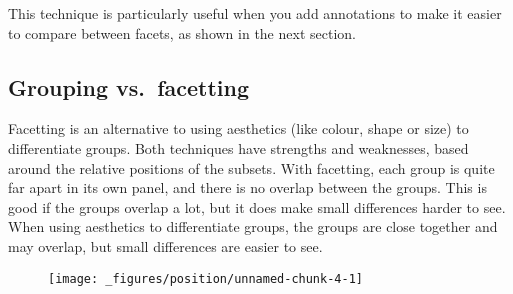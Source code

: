 This technique is particularly useful when you add annotations to make
it easier to compare between facets, as shown in the next section.

\subsection{Grouping vs.~facetting}\label{sub:group-vs-facet}

Facetting is an alternative to using aesthetics (like colour, shape or
size) to differentiate groups. Both techniques have strengths and
weaknesses, based around the relative positions of the subsets.
  With
facetting, each group is quite far apart in its own panel, and there is
no overlap between the groups. This is good if the groups overlap a lot,
but it does make small differences harder to see. When using aesthetics
to differentiate groups, the groups are close together and may overlap,
but small differences are easier to see.

\begin{Shaded}
\begin{Highlighting}[]
\StringTok{ }\NormalTok{(}
   \NormalTok{(}\NormalTok{, }\NormalTok{(}\NormalTok{, }\NormalTok{, }\NormalTok{)),}
   \NormalTok{(}\NormalTok{, }\NormalTok{(}\NormalTok{, }\NormalTok{, }\NormalTok{)),}
   \NormalTok{letters[}\NormalTok{:}\NormalTok{]}
\NormalTok{)}

\StringTok{ }
\StringTok{  }\NormalTok{(}\NormalTok{(} 
\end{Highlighting}
\end{Shaded}

\begin{figure}[H]
  \centering
  \texttt{[image: \_figures/position/unnamed-chunk-4-1]}
\end{figure}

\begin{Shaded}
\begin{Highlighting}[]
\StringTok{ }
\StringTok{  }\NormalTok{() +}\StringTok{ }
\StringTok{  }
\end{Highlighting}
\end{Shaded}

